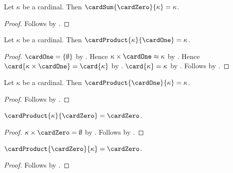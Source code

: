 \begin{corollary}\label{cardinal_sum_zero_left}
    Let $\kappa$ be a cardinal.
    Then $\cardSum{\cardZero}{\kappa}=\kappa$.
\end{corollary}
\begin{proof}
    Follows by .
\end{proof}

\begin{proposition}\label{cardinal_product_one_right}
    Let $\kappa$ be a cardinal.
    Then $\cardProduct{\kappa}{\cardOne}=\kappa$.
\end{proposition}
\begin{proof}
    $\cardOne=\{\emptyset\}$
        by .
    Hence $\kappa\times\cardOne\approx\kappa$
        by .
    Hence $\card{\kappa\times\cardOne}=\card{\kappa}$
        by .
    $\card{\kappa}=\kappa$ by .
    Follows by .
\end{proof}

\begin{corollary}\label{cardinal_product_one_left}
    Let $\kappa$ be a cardinal.
    Then $\cardProduct{\cardOne}{\kappa}=\kappa$.
\end{corollary}
\begin{proof}
    Follows by
        .
\end{proof}

\begin{proposition}\label{cardinal_product_zero_right}
    $\cardProduct{\kappa}{\cardZero}=\cardZero$.
\end{proposition}
\begin{proof}
    $\kappa\times\cardZero=\emptyset$
        by .
    Follows by .
\end{proof}

\begin{corollary}\label{cardinal_product_zero_left}
    $\cardProduct{\cardZero}{\kappa}=\cardZero$.
\end{corollary}
\begin{proof}
    Follows by
        .
\end{proof}

